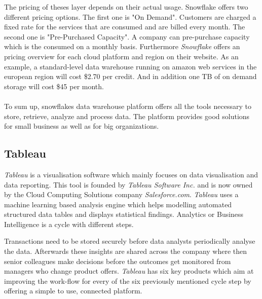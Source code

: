 \documentclass[../paper.tex]{subfiles}
\begin{document}
The pricing of theses layer depends on their actual usage. Snowflake offers two different pricing options. The first one is "On Demand". Customers are charged a fixed rate for the services that are consumed and are billed every month. The second one is "Pre-Purchased Capacity". A company can pre-purchase capacity which is the consumed on a monthly basis. Furthermore \textit{Snowflake} offers an pricing overview for each cloud platform and region on their website. As an example, a standard-level data warehouse running on amazon web services in the european region will cost \$2.70 per credit. And in addition one TB of on demand storage will cost \$45 per month. \\ \\
To sum up, snowflakes data warehouse platform offers all the tools necessary to store, retrieve, analyze and process data. The platform provides good solutions for small business as well as for big organizations. 
\subsection{Tableau}

\textit{Tableau} is a visualisation software which mainly focuses on data visualisation and data reporting. This tool is founded by \textit{Tableau Software  Inc.} and is now owned by the Cloud Computing Solutions company \textit{Salesforce.com}. \textit{Tableau} uses a machine learning based analysis engine which helps modelling  automated structured data tables and displays statistical findings. Analytics or Business Intelligence is a cycle with different steps.

Transactions need to be stored securely before data analysts periodically analyse the data. Afterwards these insights are shared across the company where then senior colleagues make decisions before the outcomes get monitored from managers who change product offers. \textit{Tableau} has six key products which aim at improving the work-flow for every of the six previously mentioned cycle step by offering a simple to use, connected platform.
\end{document}
